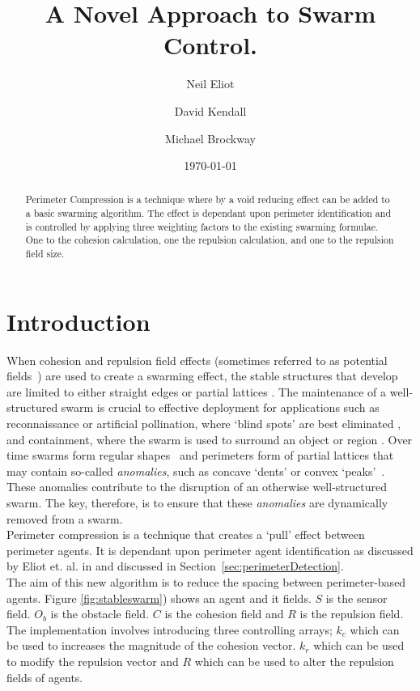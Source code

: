 \documentclass[12pt,a4paper]{IEEEtran}
\title{A Novel Approach to Swarm Control.}
\author[1,*]{Neil Eliot}
\author[ ]{David Kendall}
\author[ ]{Michael Brockway}
\affil[1] {Northumbria University, Faculty of Engineering and Environment, Department of Computer and Information Sciences}
\affil[*] {Corresponding author: Dr Neil Eliot, neil.eliot@northumbria.ac.uk}
\date{\today}
\newcommand{\kc}{\mathit{k_c}}
\newcommand{\kr}{\mathit{k_r}}
\newcommand{\rb}{\mathit{R}}
\begin{document}
\maketitle

\begin{abstract}
Perimeter Compression is a technique where by a void reducing effect can be added to a basic swarming algorithm. The effect is dependant upon perimeter identification and is controlled by applying three weighting factors to the existing swarming formulae. One to the cohesion calculation, one the repulsion calculation, and one to the repulsion field size.
\end{abstract}

\section{Introduction}
When cohesion and repulsion field effects (sometimes referred to as potential fields~\cite{BAF:06,eliot2018metric,VG:05,SW:03,Son2017,liang2019swarm}) are used to create a swarming effect, the stable structures that develop are limited to either straight edges or partial lattices \cite{eliot2017methods}. The maintenance of a well-structured swarm is crucial to effective deployment for applications such as reconnaissance or artificial pollination, where `blind spots' are best eliminated \cite{elamvazhuthi2015optimal}, and containment, where the swarm is used to surround an object or region \cite{cao2012distributed}. Over time swarms form regular shapes~\cite{RAZ:13} and perimeters form of partial lattices that may contain so-called \textit{anomalies}, such as concave `dents' or convex `peaks'~\cite{eliot2019void}. These anomalies contribute to the disruption of an otherwise well-structured swarm. The key, therefore, is to ensure that these \textit{anomalies} are dynamically removed from a swarm.\\
Perimeter compression is a technique that creates a `pull' effect between perimeter agents. It is dependant upon perimeter agent identification as discussed by Eliot et. al. in \cite{eliot2017methods, eliot2018metric, eliot2019void} and discussed in Section~\ref{sec:perimeterDetection}.\\
The aim of this new algorithm is to reduce the spacing between perimeter-based agents. Figure \ref{fig:stableswarm}) shows an agent and it fields. $S$ is the sensor field. $O_b$ is the obstacle field. $C$ is the cohesion field and $\rb$ is the repulsion field. The implementation involves introducing three controlling arrays; $\kc$ which can be used to increases the magnitude of the cohesion vector. $\kr$ which can be used to modify the repulsion vector and $\rb$ which can be used to alter the repulsion fields of agents.\\
\end{document}
